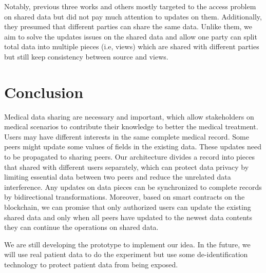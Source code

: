 \documentclass[conference]{IEEEtran}
\begin{document}
Notably, previous three works and others \cite{liu2018bpds,xia2017bbds,amofa2018blockchain,dagher2018ancile,fan2018medblock} mostly targeted to the access problem on shared data but did not pay much attention to updates on them. Additionally, they presumed that different parties can share the same data. Unlike them, we aim to solve the updates issues on the shared data and allow one party can split total data into multiple pieces (i.e, views) which are shared with different parties but still keep consistency between source and views.

\section{Conclusion}
\label{conclude}

Medical data sharing are necessary and important, which allow stakeholders on medical scenarios to contribute their knowledge to better the medical treatment. Users may have different interests in the same complete medical record. Some peers might update some values of fields in the existing data. These updates need to be propagated to sharing peers. Our architecture divides a record into pieces that shared with different users separately, which can protect data privacy by limiting essential data between two peers and reduce the unrelated data interference. Any updates on data pieces can be synchronized to complete records by bidirectional transformations. Moreover, based on smart contracts on the blockchain, we can promise that only authorized users can update the existing shared data and only when all peers have updated to the newest data contents they can continue the operations on shared data.   

We are still developing the prototype to implement our idea.
In the future, we will use real patient data to do the experiment but use some de-identification technology to protect patient data from being exposed. 




\end{document}
